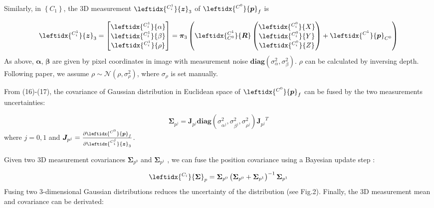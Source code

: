 \documentclass[a4paper, 10pt, conference]{ieeeconf}      %
\begin{document}
Similarly, in $\left\lbrace C_1 \right\rbrace$, the 3D measurement $ \leftidx{^{C_i^1}}{\bm { z}}_3 $ of $\leftidx{^{C^0}}{\bm  { p}}_f  $ is 

\begin{equation}
\leftidx{^{C_i^1}}{\bm { z}}_3 = \left[ \begin{matrix}  
\leftidx{^{C_i^1}}{ \alpha} \\
\leftidx{^{C_i^1}}{ \beta} \\
\leftidx{^{C_i^1}}{ \rho}
\end{matrix}\right]  = \bm \pi_3\left( \leftidx{^{C^1}_{C^0}}{\bm R}\left(  \begin{matrix}  
\leftidx{^{C_i^0}}{ X} \\
\leftidx{^{C_i^0}}{ Y} \\
\leftidx{^{C_i^0}}{ Z} 
\end{matrix} \right) + \leftidx{^{C^1}}{\bm p}_{C^0}
 \right)
\end{equation}
As above, $\bm  \alpha$, $\bm  \beta$ are given  by pixel coordinates in image with measurement noise $\bm {diag}({  \sigma}_{\alpha}^2, { \sigma}_{\beta}^2 )  $. $  \rho $ can be calculated by inversing depth. Following paper, we assume $  \rho \sim  {\mathcal N}\left(  \rho , { \sigma}_{\rho}^2 \right) $, where ${ \sigma}_{\rho}$ is set manually.


From (16)-(17), the covariance of  Gaussian distribution in Euclidean space of $\leftidx{^{C^0}}{\bm { p}}_f $ can be fused by the two measurements uncertainties:


\begin{equation}
{\bm \Sigma}_{p^j} = {\bm J_{p^j}}{\bm {diag}\left( {  \sigma}_{\alpha^j}^2, { \sigma}_{\beta^j}^2,{ \sigma}_{\rho^j}^2 \right) } {\bm J_{p^j}}^T
\end{equation}
where $ j = 0,1 $ and $
\bm J_{p^j}= \frac{\partial{\leftidx{^{C^0}}{\bm { p}}_f}}{\partial{\leftidx{^{C_i^j}}{\bm { z}}_3 }}
$.

Given two 3D measurement covariances $ {\bm \Sigma}_{p^0}  $ and $ {\bm { \Sigma}}_{p^1} $ , we can fuse  the position covariance using a  Bayesian update step \cite{stroupe2001merging}:
 
\begin{equation}
\leftidx{^{C_{i}}}{\bm { \Sigma}}_{p} ={\bm { \Sigma}}_{p^0}\left(  {\bm { \Sigma}}_{p^0} + {\bm { \Sigma}}_{p^1}\right)^{-1} {\bm { \Sigma}}_{p^1}
\end{equation}
Fusing two 3-dimensional Gaussian distributions  reduces the uncertainty 
of the distribution (see Fig.2). Finally, the 3D measurement mean and  covariance can be derivated:
\end{document}
